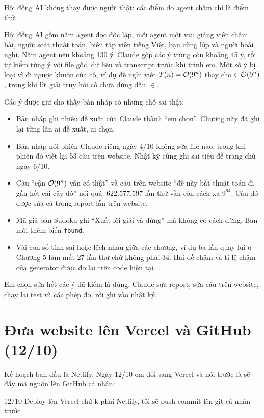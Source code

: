 Hội đồng AI không thay được người thật: các điểm do agent chấm chỉ là điểm thử.

Hội đồng AI gồm năm agent đọc độc lập, mỗi agent một vai: giảng viên chấm bài, người soát thuật toán, biên tập viên tiếng Việt, bạn cùng lớp và người hoài nghi. Năm agent nêu khoảng 130 ý. Claude gộp các ý trùng còn khoảng 45 ý, rồi tự kiểm từng ý với file gốc, dữ liệu và transcript trước khi trình em. Một số ý bị loại vì đi ngược khuôn của cô, ví dụ đề nghị viết \(T(n) = \mathcal{O}\!\left(9^n\right)\) thay cho \(\in \mathcal{O}\!\left(9^n\right)\), trong khi lời giải truy hồi cô chữa dùng dấu \(\in\).

Các ý được giữ cho thấy bản nháp có những chỗ sai thật:

\begin{itemize}
  \item Bản nháp ghi nhiều đề xuất của Claude thành ``em chọn''. Chương này đã ghi lại từng lần ai đề xuất, ai chọn.
  \item Bản nháp nói phiên Claude riêng ngày 4/10 không sửa file nào, trong khi phiên đó viết lại 53 câu trên website. Nhật ký cũng ghi sai tiêu đề trang chủ ngày 6/10.
  \item Câu ``cận \(\mathcal{O}\!\left(9^n\right)\) vẫn có thật'' và câu trên website ``đề này bắt thuật toán đi gần hết cái cây đó'' nói quá: 622.577.597 lần thử vẫn còn cách xa \(9^{64}\). Câu đó được sửa cả trong report lẫn trên website.
  \item Mã giả bản Sudoku ghi ``Xuất lời giải và dừng'' mà không có cách dừng. Bản mới thêm biến \texttt{found}.
  \item Vài con số tính sai hoặc lệch nhau giữa các chương, ví dụ ba lần quay lui ở Chương 5 làm mất 27 lần thử chứ không phải 34. Hai đề chậm và tỉ lệ chậm của generator được đo lại trên code hiện tại.
\end{itemize}

Em chọn sửa hết các ý đã kiểm là đúng. Claude sửa report, sửa câu trên website, chạy lại test và các phép đo, rồi ghi vào nhật ký.

\section{Đưa website lên Vercel và GitHub (12/10)}

Kế hoạch ban đầu là Netlify. Ngày 12/10 em đổi sang Vercel và nói trước là sẽ đẩy mã nguồn lên GitHub cá nhân:

\begin{promptbox}{12/10}
Deploy lên Vercel chứ k phải Netlify, tôi sẽ push commit lên git cá nhân trước
\end{promptbox}

